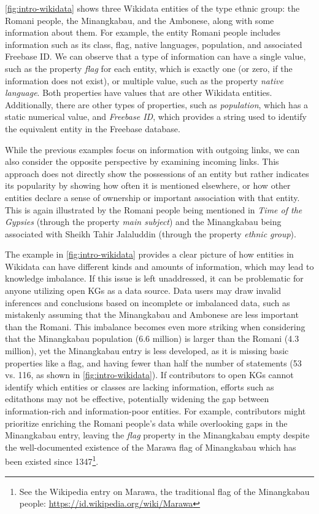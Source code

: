 \autoref{fig:intro-wikidata} shows three Wikidata entities of the type ethnic group: the Romani people, the Minangkabau, and the Ambonese, along with some information about them. For example, the entity Romani people includes information such as its class, flag, native languages, population, and associated Freebase ID. We can observe that a type of information can have a single value, such as the property \textit{flag} for each entity, which is exactly one (or zero, if the information does not exist), or multiple value, such as the property \textit{native language}. Both properties have values that are other Wikidata entities. Additionally, there are other types of properties, such as \textit{population}, which has a static numerical value, and \textit{Freebase ID}, which provides a string used to identify the equivalent entity in the Freebase database.

While the previous examples focus on information with outgoing links, we can also consider the opposite perspective by examining incoming links. This approach does not directly show the possessions of an entity but rather indicates its popularity by showing how often it is mentioned elsewhere, or how other entities declare a sense of ownership or important association with that entity. This is again illustrated by the Romani people being mentioned in \textit{Time of the Gypsies} (through the property \textit{main subject}) and the Minangkabau being associated with Sheikh Tahir Jalaluddin (through the property \textit{ethnic group}).

The example in \autoref{fig:intro-wikidata} provides a clear picture of how entities in Wikidata can have different kinds and amounts of information, which may lead to knowledge imbalance. If this issue is left unaddressed, it can be problematic for anyone utilizing open KGs as a data source. Data users may draw invalid inferences and conclusions based on incomplete or imbalanced data, such as mistakenly assuming that the Minangkabau and Ambonese are less important than the Romani. This imbalance becomes even more striking when considering that the Minangkabau population (6.6 million) is larger than the Romani (4.3 million), yet the Minangkabau entry is less developed, as it is missing basic properties like a flag, and having fewer than half the number of statements (53 vs. 116, as shown in \autoref{fig:intro-wikidata}). If contributors to open KGs cannot identify which entities or classes are lacking information, efforts such as editathons may not be effective, potentially widening the gap between information-rich and information-poor entities. For example, contributors might prioritize enriching the Romani people's data while overlooking gaps in the Minangkabau entry, leaving the \textit{flag} property in the Minangkabau empty despite the well-documented existence of the Marawa flag of Minangkabau which has been existed since 1347\footnote{See the Wikipedia entry on Marawa, the traditional flag of the Minangkabau people: \url{https://id.wikipedia.org/wiki/Marawa}}.

